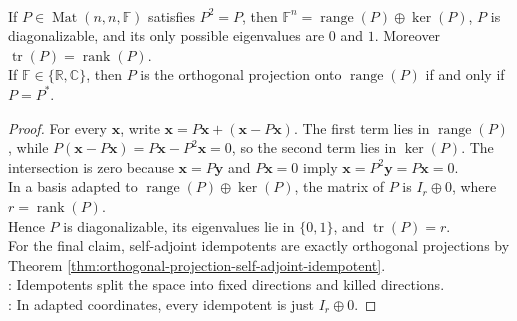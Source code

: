 \begin{proposition} \label{prop:idempotent-matrix-basic-invariants} \\
If $P\in\operatorname{Mat}(n,n,\mathbb{F})$ satisfies $P^2=P$, then $\mathbb{F}^n=\operatorname{range}(P)\oplus\ker(P)$, $P$ is diagonalizable, and its only possible eigenvalues are $0$ and $1$. Moreover $\operatorname{tr}(P)=\operatorname{rank}(P)$.\\
If $\mathbb{F}\in\{\mathbb{R},\mathbb{C}\}$, then $P$ is the orthogonal projection onto $\operatorname{range}(P)$ if and only if $P=P^*$.
\begin{proof}
For every $\mathbf{x}$, write $\mathbf{x}=P\mathbf{x}+(\mathbf{x}-P\mathbf{x})$. The first term lies in $\operatorname{range}(P)$, while $P(\mathbf{x}-P\mathbf{x})=P\mathbf{x}-P^2\mathbf{x}=0$, so the second term lies in $\ker(P)$. The intersection is zero because $\mathbf{x}=P\mathbf{y}$ and $P\mathbf{x}=0$ imply $\mathbf{x}=P^2\mathbf{y}=P\mathbf{x}=0$.\\
In a basis adapted to $\operatorname{range}(P)\oplus\ker(P)$, the matrix of $P$ is $I_r\oplus0$, where $r=\operatorname{rank}(P)$.\\
Hence $P$ is diagonalizable, its eigenvalues lie in $\{0,1\}$, and $\operatorname{tr}(P)=r$.\\
For the final claim, self-adjoint idempotents are exactly orthogonal projections by Theorem \ref{thm:orthogonal-projection-self-adjoint-idempotent}.\\
: Idempotents split the space into fixed directions and killed directions.\\
: In adapted coordinates, every idempotent is just $I_r\oplus0$.
\end{proof}
\end{proposition}

